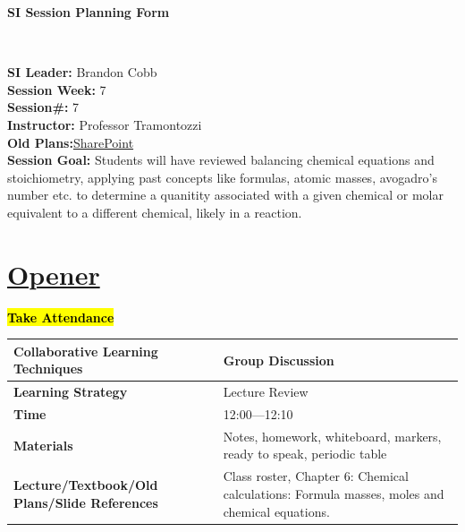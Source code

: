 \documentclass{article}
\begin{document}
\begin{center}
    {\LARGE\textbf{SI Session Planning Form}}
\end{center}

\
\noindent
\begin{flushleft}
\textbf{SI Leader:} Brandon Cobb\\
\textbf{Session Week:} 7\\
\textbf{Session\#:} 7\\
\textbf{Instructor:} Professor Tramontozzi\\
\textbf{Old Plans:}\href{https://macombedu.sharepoint.com/:b:/s/ASC-SupplementalInstructionEmbeddedTutoring/EeSYqCwT_KhMolgJvXbVEjgBOyF_DevvS8BgCm1zPkQQJg?e=QJTt4o}{SharePoint}\\
\textbf{Session Goal:} Students will have reviewed balancing chemical equations and stoichiometry, applying past concepts like formulas, atomic masses, avogadro's number etc. to determine a quanitity associated with a given chemical or molar equivalent to a different chemical, likely in a reaction. 
\end{flushleft}

\vspace{1em}
\section*{\underline{Opener}}
{\centering\large\textbf{\hl{Take Attendance}}\par}\vspace{-0.25\baselineskip}
\noindent
\begin{tabular}{|p{4.2cm}|p{9.8cm}|}
\hline
\textbf{Collaborative Learning Techniques} & Group Discussion\\
\hline
\textbf{Learning Strategy} & Lecture Review\\
\hline
\textbf{Time} & 12:00---12:10\\
\hline
\textbf{Materials} & Notes, homework, whiteboard, markers, ready to speak, periodic table \\
\hline
\textbf{Lecture/Textbook/Old Plans/Slide References} & Class roster, Chapter 6: Chemical calculations: Formula masses, moles and chemical equations.  \\
\hline
\end{tabular}
\end{document}
